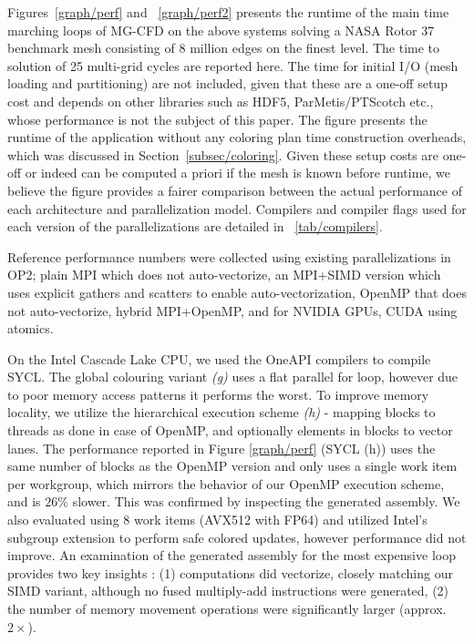 \documentclass[runningheads]{llncs}
\begin{document}
Figures~\ref{graph/perf} and ~\ref{graph/perf2} presents the runtime of the 
main time marching loops of MG-CFD on the above systems solving a NASA Rotor 37 
\cite{rotor37} benchmark mesh consisting of 8 million edges on the finest level. 
The time to solution of 25 multi-grid cycles are reported here. The time 
for initial I/O (mesh loading and partitioning) are not included, given that 
these are a one-off setup cost and depends on other libraries such as HDF5, 
ParMetis/PTScotch etc., whose performance is not the subject of this paper. The 
figure presents the runtime of the application without any coloring plan time 
construction overheads, which was discussed in Section~\ref{subsec/coloring}. 
Given these setup costs are one-off or indeed can be computed a priori if the 
mesh is known before runtime, we believe the figure provides a fairer 
comparison between the actual performance of each architecture and 
parallelization model. 
Compilers and 
compiler flags used for each version of the parallelizations are detailed 
in~\tablename{ \ref{tab/compilers}}. 

Reference performance numbers were collected using existing parallelizations in 
OP2; plain MPI which does not auto-vectorize, an MPI+SIMD version which uses 
explicit gathers and scatters to enable auto-vectorization, OpenMP that does not 
auto-vectorize, hybrid MPI+OpenMP, and for NVIDIA GPUs, CUDA using atomics.

On the Intel Cascade Lake CPU, we used the OneAPI compilers to compile SYCL. The 
global colouring variant \emph{(g)} uses a flat parallel for loop, however due 
to poor memory access patterns it performs the worst. To improve memory 
locality, we utilize the hierarchical execution scheme \emph{(h)} - mapping 
blocks to threads as done in case of OpenMP, and optionally elements in blocks 
to vector lanes. The performance reported in Figure \ref{graph/perf} (SYCL (h)) 
uses the same number of blocks as the OpenMP version and only uses a single work 
item per workgroup, which mirrors the behavior of our OpenMP execution scheme, 
and is $26\%$ slower. This was confirmed by inspecting the generated assembly. 
We also evaluated using 8 work items (AVX512 with FP64) and utilized Intel's 
subgroup extension to perform safe colored updates, however performance did not 
improve. An examination of the generated assembly for the most expensive loop 
provides two key insights : (1) computations did vectorize, closely matching our 
SIMD variant, although no fused multiply-add instructions were generated, (2) 
the number of memory movement operations were significantly larger (approx. 
$2\times$).
\end{document}

